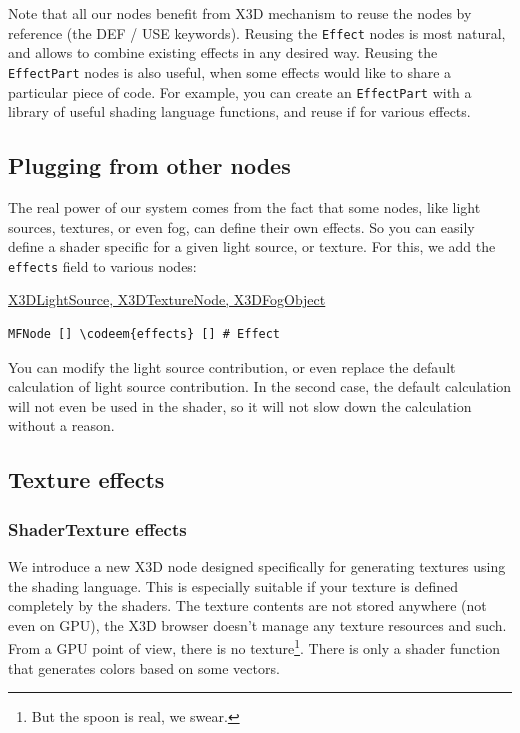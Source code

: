 \documentclass{acmsiggraph}                     %
\newenvironment{mycode}
{\begin{mycodecore}}
{\end{mycodecore}
\vspace{-0.1in}}
\newcommand*{\codeem}[1]{\textbf{#1}}
\begin{document}
Note that all our nodes benefit from X3D mechanism to reuse the nodes
by reference (the DEF / USE keywords). Reusing the \texttt{Effect} nodes
is most natural, and allows to combine existing effects in any desired way.
Reusing the \texttt{EffectPart} nodes is also useful, when some effects
would like to share a particular piece of code. For example,
you can create an \texttt{EffectPart} with a library of useful
shading language functions, and reuse if for various effects.

\subsection{Plugging from other nodes}

The real power of our system comes from the fact that some nodes,
like light sources, textures, or even fog, can define their own effects.
So you can easily define a shader specific for a given light source,
or texture. For this, we add the \texttt{effects} field to various nodes:

\begin{mycode}
\underline{X3DLightSource, X3DTextureNode, X3DFogObject}
\begin{Verbatim}[commandchars=\\\{\}]
MFNode [] \codeem{effects} [] # Effect
\end{Verbatim}
\end{mycode}


You can modify the light source contribution, or even replace the default
calculation of light source contribution. In the second case,
the default calculation will not even be used in the shader,
so it will not slow down the calculation without a reason.

\subsection{Texture effects}

\subsubsection{ShaderTexture effects}

We introduce a new X3D node designed specifically for generating
textures using the shading language. This is especially suitable
if your texture is defined completely by the shaders.
The texture contents are not stored anywhere (not even on GPU),
the X3D browser doesn't manage any texture resources and such.
From a GPU point of view, there is no texture\footnote{But the spoon is real,
we swear.}. There is only a shader function that generates colors
based on some vectors.
\end{document}

